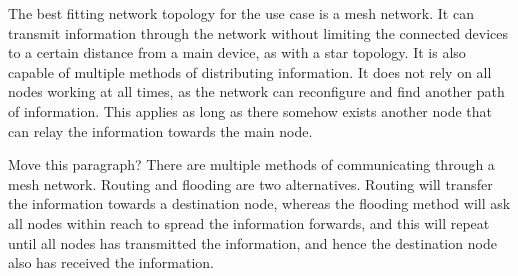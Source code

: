 The best fitting network topology for the use case is a mesh network. It can transmit information through the network without limiting the connected devices to a certain distance from a main device, as with a star topology. It is also capable of multiple methods of distributing information. It does not rely on all nodes working at all times, as the network can reconfigure and find another path of information. This applies as long as there somehow exists another node that can relay the information towards the main node.

Move this paragraph?
There are multiple methods of communicating through a mesh network. Routing and flooding are two alternatives. Routing will transfer the information towards a destination node, whereas the flooding method will ask all nodes within reach to spread the information forwards, and this will repeat until all nodes has transmitted the information, and hence the destination node also has received the information.



